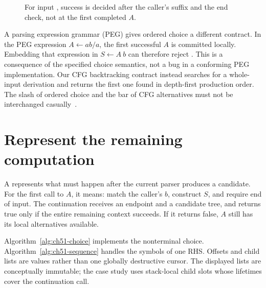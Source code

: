 \begin{figure}[htbp]
\centering
{}
\caption{For input , success is decided after the caller's suffix and the end check, not at the first completed $A$.}
\label{fig:ch51-search}
\end{figure}

A parsing expression grammar (PEG) gives ordered choice a different contract.
In the PEG expression $A\leftarrow ab/a$, the first successful $A$ is committed locally.
Embedding that expression in $S\leftarrow A\ b$ can therefore reject .
This is a consequence of the specified choice semantics, not a bug in a conforming PEG implementation.
Our CFG backtracking contract instead searches for a whole-input derivation and returns the first one found in depth-first production order.
The slash of ordered choice and the bar of CFG alternatives must not be interchanged casually~\cite{grune-2008-parsing}.

\section{Represent the remaining computation}
\label{sec:ch51-continuations}

A  represents what must happen after the current parser produces a candidate.
For the first call to $A$, it means: match the caller's $b$, construct $S$, and require end of input.
The continuation receives an endpoint and a candidate tree, and returns true only if the entire remaining context succeeds.
If it returns false, $A$ still has its local alternatives available.

Algorithm~\ref{alg:ch51-choice} implements the nonterminal choice.
Algorithm~\ref{alg:ch51-sequence} handles the symbols of one RHS.
Offsets and child lists are values rather than one globally destructive cursor.
The displayed lists are conceptually immutable; the case study uses stack-local child slots whose lifetimes cover the continuation call.

